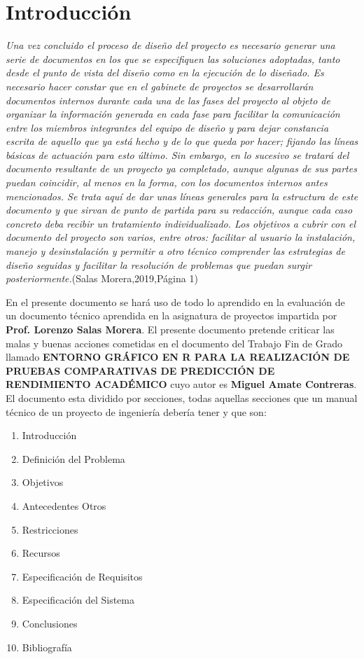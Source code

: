 \chapter{Introducción}

\textit{Una vez concluido el proceso de diseño del proyecto es necesario generar una serie de
documentos en los que se especifiquen las soluciones adoptadas, tanto desde el punto de
vista del diseño como en la ejecución de lo diseñado. Es necesario hacer constar que en
el gabinete de proyectos se desarrollarán documentos internos durante cada una de las
fases del proyecto al objeto de organizar la información generada en cada fase para facilitar la comunicación entre los miembros integrantes del equipo de diseño y para dejar
constancia escrita de aquello que ya está hecho y de lo que queda por hacer; fijando las
líneas básicas de actuación para esto último. Sin embargo, en lo sucesivo se tratará del
documento resultante de un proyecto ya completado, aunque algunas de sus partes puedan coincidir, al menos en la forma, con los documentos internos antes mencionados. Se
trata aquí de dar unas líneas generales para la estructura de este documento y que sirvan
de punto de partida para su redacción, aunque cada caso concreto deba recibir un tratamiento individualizado. Los objetivos a cubrir con el documento del proyecto son varios, entre otros: facilitar al usuario la instalación, manejo y desinstalación y permitir a
otro técnico comprender las estrategias de diseño seguidas y facilitar la resolución de
problemas que puedan surgir posteriormente.}(Salas Morera,2019,Página 1)


En el presente documento se hará uso de todo lo aprendido en la evaluación de un documento técnico aprendida en la asignatura de proyectos impartida por \textbf{Prof. Lorenzo Salas Morera}.
\hspace{0.75em}
El presente documento pretende criticar las malas y buenas acciones cometidas en el documento del Trabajo Fin de Grado llamado \textbf{ENTORNO GRÁFICO EN R PARA LA REALIZACIÓN DE PRUEBAS COMPARATIVAS DE PREDICCIÓN DE RENDIMIENTO ACADÉMICO} cuyo autor es \textbf{Miguel Amate Contreras}.
\hspace{0.75em}
El documento esta dividido por secciones, todas aquellas secciones que un manual técnico de un proyecto de ingeniería debería tener y que son:

\begin{enumerate}
    \item Introducción 
    \item Definición del Problema 
    \item Objetivos 
    \item Antecedentes Otros
    \item Restricciones
    \item Recursos
    \item Especificación de Requisitos
    \item Especificación del Sistema
    \item Conclusiones
    \item Bibliografía
\end{enumerate}

